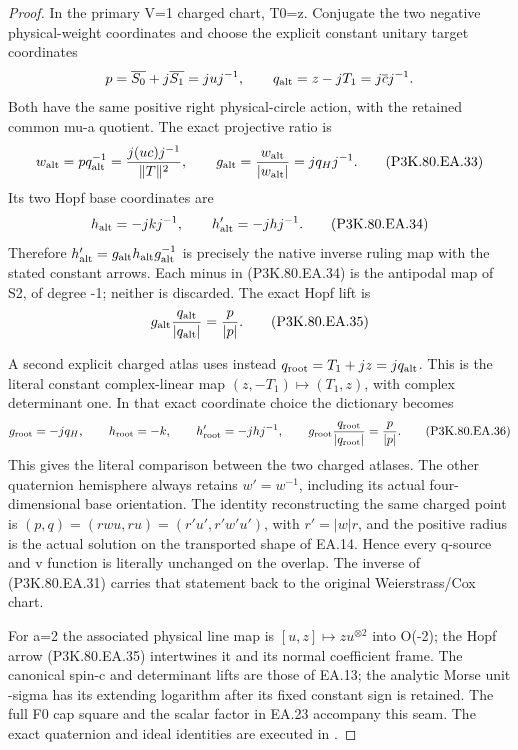 \begin{proof}
In the primary V=1 charged chart, T0=z. Conjugate the two
negative physical-weight coordinates and choose the explicit
constant unitary target coordinates
\[
 p=\overline{S_0}+j\overline{S_1}=j u j^{-1},\qquad
 q_{\rm alt}=z-jT_1=j\overline c j^{-1}.
\]
Both have the same positive right physical-circle action, with
the retained common mu-a quotient. The exact projective ratio is
\[
 w_{\rm alt}=p q_{\rm alt}^{-1}
       =\frac{j(u c)j^{-1}}{\|T\|^2},\qquad
 g_{\rm alt}=\frac{w_{\rm alt}}{|w_{\rm alt}|}
       =j q_H j^{-1}.
 \tag{P3K.80.EA.33}
\]
Its two Hopf base coordinates are
\[
 h_{\rm alt}=-j k j^{-1},\qquad
 h'_{\rm alt}=-j h j^{-1}.
 \tag{P3K.80.EA.34}
\]
Therefore \(h'_{\rm alt}=g_{\rm alt}h_{\rm alt}
g_{\rm alt}^{-1}\) is precisely the native inverse ruling
map with the stated constant arrows. Each minus in (P3K.80.EA.34)
is the antipodal map of S2, of degree -1; neither is discarded.
The exact Hopf lift is
\[
       g_{\rm alt}\frac{q_{\rm alt}}{|q_{\rm alt}|}
                           =\frac p{|p|}.
 \tag{P3K.80.EA.35}
\]

A second explicit charged atlas uses instead
\(q_{\rm root}=T_1+jz=j q_{\rm alt}\).
This is the literal constant complex-linear map
\((z,-T_1)\mapsto(T_1,z)\), with complex determinant one.
In that exact coordinate choice the dictionary becomes
\[
 g_{\rm root}=-j q_H,\qquad h_{\rm root}=-k,
 \qquad h'_{\rm root}=-j h j^{-1},
 \qquad
 g_{\rm root}\frac{q_{\rm root}}{|q_{\rm root}|}
                               =\frac p{|p|}.
 \tag{P3K.80.EA.36}
\]
This gives the literal comparison between the two charged atlases. The other quaternion
hemisphere always retains \(w'=w^{-1}\), including its actual
four-dimensional base orientation. The identity reconstructing
the same charged point is
\((p,q)=(rwu,ru)=(r'u',r'w'u')\), with \(r'=|w|r\),
and the positive radius is the actual solution on the transported
shape of EA.14. Hence every q-source and v function is literally
unchanged on the overlap. The inverse of (P3K.80.EA.31) carries that
statement back to the original Weierstrass/Cox chart.

For a=2 the associated physical line map is
\([u,z]\mapsto z u^{\otimes2}\) into O(-2); the Hopf arrow
(P3K.80.EA.35) intertwines it and its normal coefficient frame. The
canonical spin-c and determinant lifts are those of EA.13;
the analytic Morse unit -sigma has its extending logarithm
after its fixed constant sign is retained. The full F0 cap
square and the scalar factor in EA.23 accompany this seam.
The exact quaternion and ideal identities are executed in
.


\end{proof}
